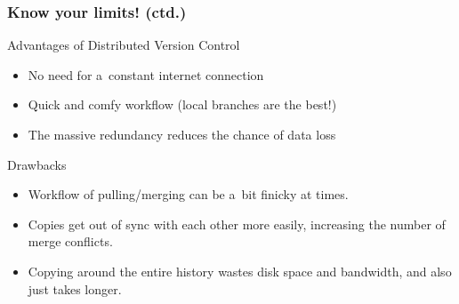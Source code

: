 \documentclass[12pt]{beamer}
\begin{document}
\begin{frame}
  \frametitle{Know your limits! (ctd.)}

  \begin{block}{Advantages of Distributed Version Control}
    \begin{itemize}
      \item No need for a~constant internet connection
      \item Quick and comfy workflow (local branches are the best!)
      \item The massive redundancy reduces the chance of data loss
    \end{itemize}
  \end{block}

  \begin{block}{Drawbacks}
    \begin{itemize}
      \item Workflow of pulling/merging can be a~bit finicky at times.
      \item Copies get out of sync with each other more easily, increasing the
        number of merge conflicts.
      \item Copying around the entire history wastes disk space and bandwidth,
        and also just takes longer.
    \end{itemize}
  \end{block}
\end{frame}

%
\end{document}
